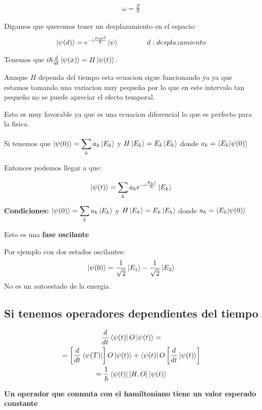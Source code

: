 \documentclass{article}
\newcommand{\caja}[3]{%
  \begin{tcolorbox}[colback=#1!5!white,colframe=#1!25!black,title=#2]
    #3
  \end{tcolorbox}%
}
\begin{document}
\hfill 
\begin{gather*}
  \omega = \frac{E}{\hbar } 
\end{gather*}
\hfill

Digamos que queremos tener un desplazamiento en el espacio: 
\begin{gather*}
  \ket{\psi(d)} = e ^ {- i \frac{p _{op} \dot d }{\hbar }}\ket{\psi} \qquad \qquad d:desplazamiento
\end{gather*}

\hfill 

\hfill 
\caja{red}{Derivada del operador }{
  Tenemos que $ i \hbar  \frac{d  }{d t}\ket{\psi(x)} = H \ket{\psi(t) }  $.

  Aunque $ H  $ dependa del tiempo esta ecuacion sigue funcionando ya ya que estamos tomando una variacion muy pequeña por lo que en este intervalo tan pequeño no se puede apreciar el efecto temporal.

  Esto es muy favorable ya que es una ecuacion diferencial lo que es perfecto para la fisica. 
}

Si tenemos que $ \ket{\psi(0)} = \displaystyle\sum_{k }^{}a_k \ket{E_k }  $ y $ H \ket{E_ k } = E_k \ket{E_k } $ donde $ a_k = \bra{E_k }\ket{\psi(0)}  $

Entonces podemos llegar a que: 
\caja{red}{}{
  \begin{gather*}
    \ket{\psi(t) } = \displaystyle\sum_{k }^{} a_k e ^ {-i \frac{E_k t }{\hbar }}\ket{E_k } 
  \end{gather*}
  \textbf{Condiciones: } $ \ket{\psi(0)} = \displaystyle\sum_{k }^{}a_k \ket{E_k }  $ y $ H \ket{E_ k } = E_k \ket{E_k } $ donde $ a_k = \bra{E_k }\ket{\psi(0)} $

  Esto es una \textbf{fase oscilante}
}

Por ejemplo con dos estados oscilantes: 
\begin{gather*}
  \ket{\psi(0)} = \frac{1}{\sqrt{2 } }\ket{E_1} - \frac{1}{\sqrt{2 } }\ket{E_2} 
\end{gather*}
No es un autoestado de la energia. 

\subsection{Si tenemos operadores dependientes del tiempo }
\begin{gather}
  \frac{d  }{d t }\bra{\psi(t) }O \ket{\psi(t) } = \\
  = \left[\frac{d  }{d t } \bra{\psi(T)}\right]O \ket{\psi(t) } + \bra{\psi(t) }O \left[\frac{d  }{d t }\ket{\psi(t) }\right]\\
  = \frac{1}{\hbar }\bra{\psi(t) }[H,O]\ket{\psi(t)} \label{eq:derivada_t_observable}
\end{gather}
\caja{black}{}{
  \textbf{Un operador que conmuta con el hamiltoniano tiene un valor esperado constante}
}
\end{document}
